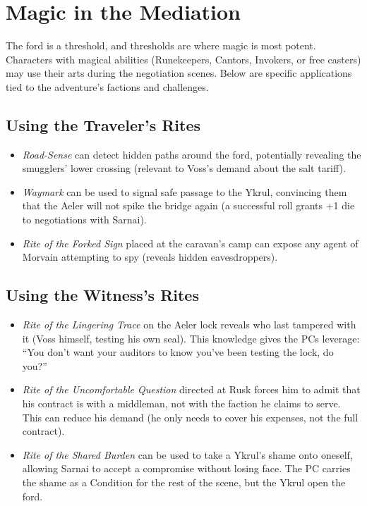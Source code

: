 \documentclass[10pt,twoside]{book}
\begin{document}
\section*{Magic in the Mediation}

The ford is a threshold, and thresholds are where magic is most potent. Characters with magical abilities (Runekeepers, Cantors, Invokers, or free casters) may use their arts during the negotiation scenes. Below are specific applications tied to the adventure's factions and challenges.

\subsection*{Using the Traveler's Rites}

\begin{itemize}
\item \textit{Road-Sense} can detect hidden paths around the ford, potentially revealing the smugglers' lower crossing (relevant to Voss's demand about the salt tariff).
\item \textit{Waymark} can be used to signal safe passage to the Ykrul, convincing them that the Aeler will not spike the bridge again (a successful roll grants +1 die to negotiations with Sarnai).
\item \textit{Rite of the Forked Sign} placed at the caravan's camp can expose any agent of Morvain attempting to spy (reveals hidden eavesdroppers).
\end{itemize}

\subsection*{Using the Witness's Rites}

\begin{itemize}
\item \textit{Rite of the Lingering Trace} on the Aeler lock reveals who last tampered with it (Voss himself, testing his own seal). This knowledge gives the PCs leverage: ``You don't want your auditors to know you've been testing the lock, do you?''
\item \textit{Rite of the Uncomfortable Question} directed at Rusk forces him to admit that his contract is with a middleman, not with the faction he claims to serve. This can reduce his demand (he only needs to cover his expenses, not the full contract).
\item \textit{Rite of the Shared Burden} can be used to take a Ykrul's shame onto oneself, allowing Sarnai to accept a compromise without losing face. The PC carries the shame as a Condition for the rest of the scene, but the Ykrul open the ford.
\end{itemize}
\end{document}
